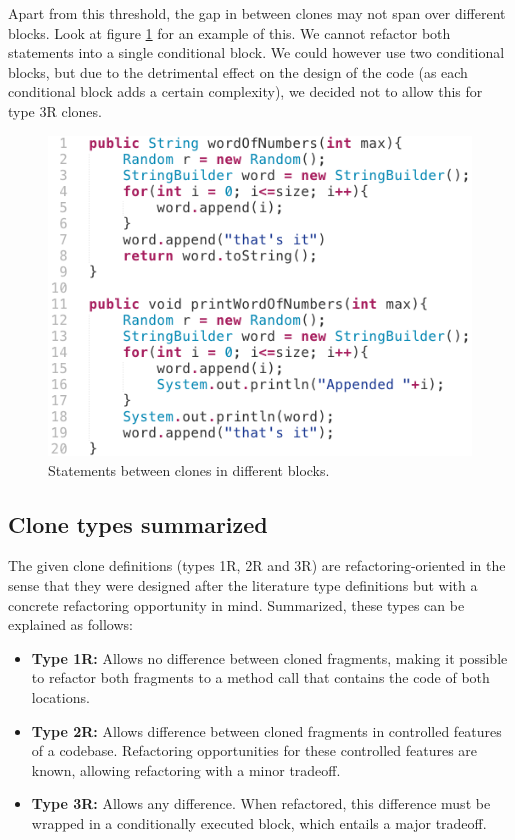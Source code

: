 Apart from this threshold, the gap in between clones may not span over different blocks. Look at figure \ref{fig:type3invalid} for an example of this. We cannot refactor both statements into a single conditional block. We could however use two conditional blocks, but due to the detrimental effect on the design of the code (as each conditional block adds a certain complexity), we decided not to allow this for type 3R clones.

\begin{figure}[H]
  \centering
  \includegraphics[width=0.6\columnwidth]{img/type3invalid}
  \caption{Statements between clones in different blocks.}
  \label{fig:type3invalid}
\end{figure}

\subsection{Clone types summarized}
The given clone definitions (types 1R, 2R and 3R) are refactoring-oriented in the sense that they were designed after the literature type definitions but with a concrete refactoring opportunity in mind. Summarized, these types can be explained as follows:

\begin{itemize}
\item \textbf{Type 1R:} Allows no difference between cloned fragments, making it possible to refactor both fragments to a method call that contains the code of both locations. \\
\item \textbf{Type 2R:} Allows difference between cloned fragments in controlled features of a codebase. Refactoring opportunities for these controlled features are known, allowing refactoring with a minor tradeoff. \\
\item \textbf{Type 3R:} Allows any difference. When refactored, this difference must be wrapped in a conditionally executed block, which entails a major tradeoff.
\end{itemize}

